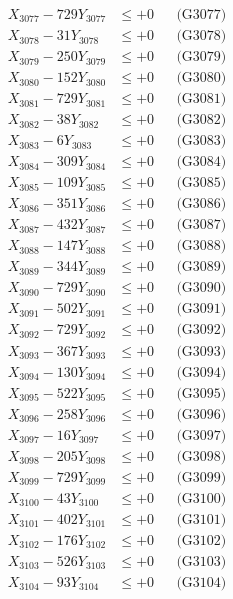 \documentclass[a4paper,10pt]{article}
\begin{document}
{\begin{align}
X_{3077} - 729Y_{3077} &\leq +0 && \text{(G3077)} \\
X_{3078} - 31Y_{3078} &\leq +0 && \text{(G3078)} \\
X_{3079} - 250Y_{3079} &\leq +0 && \text{(G3079)} \\
X_{3080} - 152Y_{3080} &\leq +0 && \text{(G3080)} \\
\allowbreak
X_{3081} - 729Y_{3081} &\leq +0 && \text{(G3081)} \\
X_{3082} - 38Y_{3082} &\leq +0 && \text{(G3082)} \\
X_{3083} - 6Y_{3083} &\leq +0 && \text{(G3083)} \\
X_{3084} - 309Y_{3084} &\leq +0 && \text{(G3084)} \\
X_{3085} - 109Y_{3085} &\leq +0 && \text{(G3085)} \\
X_{3086} - 351Y_{3086} &\leq +0 && \text{(G3086)} \\
X_{3087} - 432Y_{3087} &\leq +0 && \text{(G3087)} \\
X_{3088} - 147Y_{3088} &\leq +0 && \text{(G3088)} \\
X_{3089} - 344Y_{3089} &\leq +0 && \text{(G3089)} \\
X_{3090} - 729Y_{3090} &\leq +0 && \text{(G3090)} \\
\allowbreak
X_{3091} - 502Y_{3091} &\leq +0 && \text{(G3091)} \\
X_{3092} - 729Y_{3092} &\leq +0 && \text{(G3092)} \\
X_{3093} - 367Y_{3093} &\leq +0 && \text{(G3093)} \\
X_{3094} - 130Y_{3094} &\leq +0 && \text{(G3094)} \\
X_{3095} - 522Y_{3095} &\leq +0 && \text{(G3095)} \\
X_{3096} - 258Y_{3096} &\leq +0 && \text{(G3096)} \\
X_{3097} - 16Y_{3097} &\leq +0 && \text{(G3097)} \\
X_{3098} - 205Y_{3098} &\leq +0 && \text{(G3098)} \\
X_{3099} - 729Y_{3099} &\leq +0 && \text{(G3099)} \\
X_{3100} - 43Y_{3100} &\leq +0 && \text{(G3100)} \\
\allowbreak
X_{3101} - 402Y_{3101} &\leq +0 && \text{(G3101)} \\
X_{3102} - 176Y_{3102} &\leq +0 && \text{(G3102)} \\
X_{3103} - 526Y_{3103} &\leq +0 && \text{(G3103)} \\
X_{3104} - 93Y_{3104} &\leq +0 && \text{(G3104)} \\

\end{align}}
\end{document}
